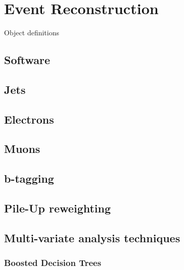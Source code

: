 \chapter{Event Reconstruction}
\label{c:recon}
Object definitions

\section{Software}

\section{Jets}

\section{Electrons}

\section{Muons}

\section{b-tagging}

\section{Pile-Up reweighting}
\label{sec:pile-up}

\section{Multi-variate analysis techniques}
\subsection{Boosted Decision Trees}
\label{sec:BDT}